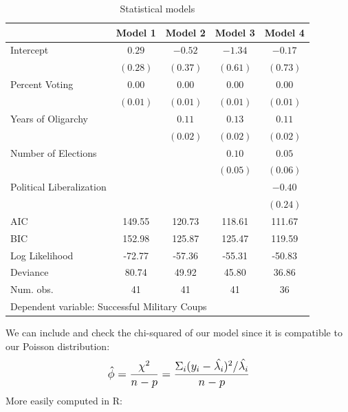\documentclass[12pt]{article}\usepackage[]{graphicx}\usepackage[]{color}
\begin{document}
\begin{flushleft}
\begin{table}[h!]
\caption{Statistical models}
\begin{center}
\begin{tabular}{l c c c c }
\hline
 & Model 1 & Model 2 & Model 3 & Model 4 \\
\hline
Intercept                & $0.29$   & $-0.52$  & $-1.34$  & $-0.17$  \\
                         & $(0.28)$ & $(0.37)$ & $(0.61)$ & $(0.73)$ \\
Percent Voting           & $0.00$   & $0.00$   & $0.00$   & $0.00$   \\
                         & $(0.01)$ & $(0.01)$ & $(0.01)$ & $(0.01)$ \\
Years of Oligarchy       &          & $0.11$   & $0.13$   & $0.11$   \\
                         &          & $(0.02)$ & $(0.02)$ & $(0.02)$ \\
Number of Elections      &          &          & $0.10$   & $0.05$   \\
                         &          &          & $(0.05)$ & $(0.06)$ \\
Political Liberalization &          &          &          & $-0.40$  \\
                         &          &          &          & $(0.24)$ \\
\hline
AIC                      & 149.55   & 120.73   & 118.61   & 111.67   \\
BIC                      & 152.98   & 125.87   & 125.47   & 119.59   \\
Log Likelihood           & -72.77   & -57.36   & -55.31   & -50.83   \\
Deviance                 & 80.74    & 49.92    & 45.80    & 36.86    \\
Num. obs.                & 41       & 41       & 41       & 36       \\
\hline
\multicolumn{5}{l}{\scriptsize{Dependent variable: Successful Military Coups}}
\end{tabular}
\end{center}
\end{table}

We can include and check the chi-squared of our model since it is compatible to our Poisson distribution:\\
\begin{equation}
\mathlarger{ \hat{\phi} = \frac{\chi^2}{n-p} = \frac{\Sigma_i(y_i - \hat{\lambda_i})^2 /\hat{ \lambda_i}}{n-p} }
\end{equation}
More easily computed in R:\\


\end{flushleft}
\end{document}
